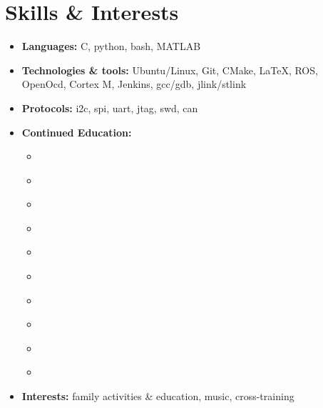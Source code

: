 \documentclass[letterpaper,11pt]{article}
\def\vspaceAfterBullets{3.5pt} %
\def\bulletIndent{20pt} %
\newcommand{\bulletItem}[1]{
  \item\small{
    {#1}
  }
}
\newcommand{\sectionListStart}{\begin{itemize}[leftmargin=0pt, label={}]}
\newcommand{\sectionListEnd}{\end{itemize}}
\newcommand{\outerBulletListStart}{\begin{itemize}[leftmargin=\bulletIndent]}
\newcommand{\outerBulletListEnd}{\end{itemize}\vspace{\vspaceAfterBullets}}
\newcommand{\bref}[2]{\href{#1}{\color{blue}{#2}}}
\begin{document}
\section{Skills \& Interests}
\sectionListStart
\bulletItem{\textbf{Languages:}{ C, python, bash, MATLAB}}
\vspace{\vspaceAfterBullets}
\bulletItem{\textbf{Technologies \& tools:}{ Ubuntu/Linux, Git, CMake, \LaTeX, ROS, OpenOcd, Cortex M, Jenkins, gcc/gdb, jlink/stlink}}
\vspace{\vspaceAfterBullets}
\bulletItem{\textbf{Protocols:}{ i2c, spi, uart, jtag, swd, can}}
\vspace{\vspaceAfterBullets}

\bulletItem{\textbf{Continued Education:} \bref{https://github.com/slalomeset/certificates/blob/main/UdemyCoursesCertification.pdf}{click\&check certificates} }
\outerBulletListStart
\bulletItem{\bref{https://www.udemy.com/course/mastering-rtos-hands-on-with-freertos-arduino-and-stm32fx/}{Mastering RTOS: Hands on FreeRTOS and STM32Fx with Debugging}}
\bulletItem{\bref{https://www.udemy.com/course/bash-mastery/?kw=Bash+Mastery\%3A+The+Complete+Guide+to+Bash+Shell+Scriptin&src=sac}{Bash Mastery: The Complete Guide to Bash Shell Scripting}}
\bulletItem{\bref{https://www.udemy.com/course/embedded-system-programming-on-arm-cortex-m3m4/}{Embedded Systems Programming on ARM Cortex-M3 M4 Processor}}
\bulletItem{\bref{https://www.udemy.com/course/microcontroller-programming-stm32-timers-pwm-can-bus-protocol/}{Mastering Microcontroller: Timers, PWM, CAN, Low Power (MCU2)}}
\bulletItem{\bref{https://www.udemy.com/course/embedded-linux-step-by-step-using-beaglebone/}{Embedded Linux Step by Step Using Beaglebone Black}}
\bulletItem{\bref{https://www.udemy.com/course/complete-python-bootcamp/}{The Complete Python Bootcamp From Zero to Hero in Python}}
\bulletItem{\bref{https://www.udemy.com/course/git-complete}{Git Complete: The definitive, step-by-step guide to Git}}
\bulletItem{\bref{https://www.udemy.com/course/mastering-microcontroller-with-peripheral-driver-development/?kw=Mastering+Microcontroller+and+Embedded+Driver+Development&src=sac}{Mastering Microcontroller and Embedded Driver Development}}
\bulletItem{\bref{https://www.udemy.com/course/stm32f4-arm-cortex-mx-custom-bootloader-development/?couponCode=25BBPMXINACTIVE}{STM32Fx Microcontroller Custom Bootloader Development}}
\bulletItem{\bref{https://www.udemy.com/course/microcontroller-embedded-c-programming/?kw=Microcontroller+Embedded+C+Programming\%3A+absolute+beginners&src=sac}{Microcontroller Embedded C Programming: Absolute Beginners}}
\outerBulletListEnd
\vspace{\vspaceAfterBullets}
\bulletItem{\textbf{Interests:}{ family activities \& education, music, cross-training}}
\sectionListEnd
\vspace{1em} %
\end{document}
